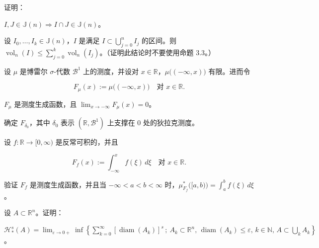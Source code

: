 \begin{exercises}
\item

证明：

\begin{items}
\item

$ I, J \in \mathbb{J}(n) \Rightarrow I \cap J \in \mathbb{J}(n) $。

\item

设 $ I_0, \ldots, I_k \in \mathbb{J}(n) $，$ I $ 是满足 $ I \subset \bigcup_{j=0}^n I_j $ 的区间。则 $ \operatorname{vol}_n(I) \le \sum_{j=0}^k \operatorname{vol}_n(I_j) $。（证明此结论时不要使用命题 3.3。）

\end{items}

\item

\begin{items}
\item

设 $ \mu $ 是博雷尔 $ \sigma $-代数 $ \mathcal{B}^1 $ 上的测度，并设对 $ x \in \mathbb{R} $，$ \mu\big((-\infty, x)\big) $ 有限。进而令

\[
F_\mu(x) := \mu\big((-\infty, x)\big) \quad \text{对 } x \in \mathbb{R} .
\]

\proofhead
$ F_\mu $ 是测度生成函数，且 $ \lim_{x \to -\infty} F_\mu(x) = 0 $。
\item

确定 $ F_{\delta_0} $，其中 $ \delta_0 $ 表示 $ (\mathbb{R}, \mathcal{B}^1) $ 上支撑在 0 处的狄拉克测度。

\end{items}

\item

设 $ f\colon \mathbb{R} \to [0, \infty) $ 是反常可积的，并且

\[
F_f(x) := \int_{-\infty}^{x} f(\xi)\, d\xi \quad \text{对 } x \in \mathbb{R} .
\]

验证 $ F_f $ 是测度生成函数，并且当 $ -\infty < a < b < \infty $ 时，$ \mu_{F_f}^*\big([a, b)\big) = \int_a^b f(\xi)\, d\xi $。

\item

设 $ A \subset \mathbb{R}^n $。证明：

\begin{items}
\item

$ \mathcal{H}_*^s(A) = \lim_{\varepsilon \to 0+} \inf\left\{ \sum_{k=0}^{\infty} [\operatorname{diam}(A_k)]^s \,;\ A_k \subset \mathbb{R}^n,\, \operatorname{diam}(A_k) \le \varepsilon,\, k \in \mathbb{N},\, A \subset \bigcup_k A_k \right\} $。


\end{items}
\end{exercises}
